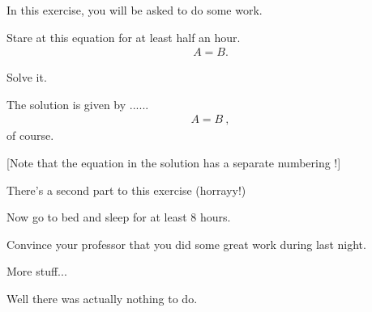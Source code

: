 \documentclass[11pt,a4paper]{article}
\begin{document}
\MakeUebungHeader




In this exercise, you will be asked to do some work.


\begin{exenumerate}
\item Stare at this equation for at least half an hour.
  \begin{align}
    A = B.
  \end{align}

\item Solve it.

  \begin{loesung}
    The solution is given by ...... 
    \begin{align}
      A=B\ ,
    \end{align}
    of course.

    [Note that the equation in the solution has a separate numbering !]
  \end{loesung}
\end{exenumerate}

There's a second part to this exercise (horrayy!)

\begin{exenumerate} %
\item Now go to bed and sleep for at least 8 hours.
\item Convince your professor that you did some great work during last night.
\end{exenumerate}



More stuff...

\begin{solution}
  Well there was actually nothing to do.
\end{solution}
\end{document}
